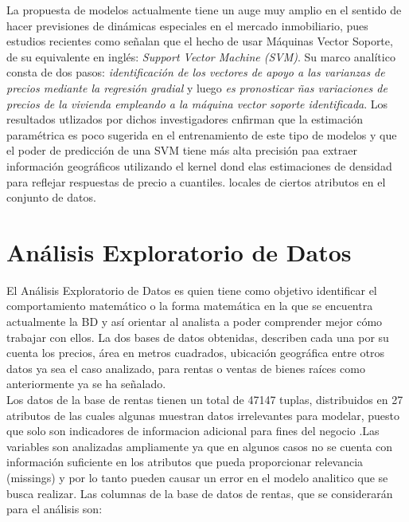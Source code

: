 \documentclass[a4paper,12pt]{article}
\begin{document}
La propuesta de modelos actualmente tiene un auge muy amplio en el sentido de hacer previsiones de dinámicas especiales en el 
mercado inmobiliario, pues estudios recientes  como \cite{chen2017forecasting} señalan que el hecho de usar Máquinas Vector 
Soporte, de su equivalente en inglés: \textit{Support Vector Machine (SVM)}. Su marco analítico consta de dos pasos: 
\textit{identificación de los vectores de apoyo a las varianzas de precios mediante la regresión gradial} y luego \textit{es 
pronosticar ñas variaciones de precios de la vivienda empleando a la máquina vector soporte identificada}. Los resultados 
utlizados por dichos investigadores cnfirman que la estimación paramétrica es poco sugerida en el entrenamiento de este tipo de 
modelos y que el poder de predicción de una SVM tiene más alta precisión paa extraer información geográficos utilizando el kernel 
dond elas estimaciones de densidad para reflejar respuestas de precio a cuantiles. locales de ciertos atributos en el conjunto 
de datos. 
\section{Análisis Exploratorio de Datos}
El Análisis Exploratorio de Datos es quien tiene como objetivo identificar el comportamiento matemático o la forma matemática en 
la que se encuentra actualmente la BD y así orientar al analista a poder comprender mejor cómo trabajar con ellos. La dos bases de 
datos obtenidas, describen cada una por su cuenta los precios, área en metros cuadrados, ubicación geográfica entre otros datos ya 
sea el caso analizado, para rentas o ventas de bienes raíces como anteriormente ya se ha señalado.\\
Los datos de la base de rentas tienen un total de 47147 tuplas, distribuidos en 27 atributos de las cuales algunas muestran datos 
irrelevantes para modelar, puesto que solo son indicadores de informacion adicional para fines del negocio .Las variables son 
analizadas ampliamente ya que en algunos casos no se cuenta con información suficiente en los atributos que pueda proporcionar 
relevancia (missings) y por lo tanto pueden causar un error en el modelo analitico que se busca realizar.
Las columnas de la base de datos de rentas, que se considerarán para el análisis son:
\vspace{5mm}
\end{document}

